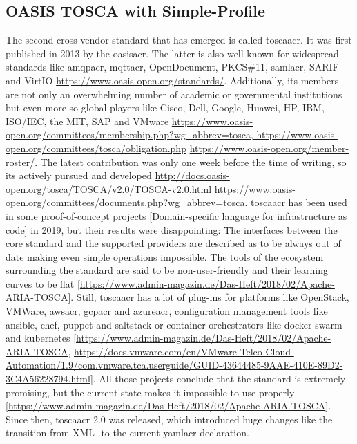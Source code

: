 \subsection{OASIS TOSCA with Simple-Profile}
The second cross-vendor standard that has emerged is called \gls{toscaacr}. It was first published in 2013 by the \gls{oasisacr}. The latter is also well-known for widespread standards like \gls{amqpacr}, \gls{mqttacr}, OpenDocument, PKCS\#11, \gls{samlacr}, SARIF and VirtIO \url{https://www.oasis-open.org/standards/}. Additionally, its members are not only an overwhelming number of academic or governmental institutions but even more so global players like Cisco, Dell, Google, Huawei, HP, IBM, ISO/IEC, the MIT, SAP and VMware \url{https://www.oasis-open.org/committees/membership.php?wg\_abbrev=tosca, https://www.oasis-open.org/committees/tosca/obligation.php} \url{https://www.oasis-open.org/member-roster/}. The latest contribution was only one week before the time of writing, so its actively pursued and developed \url{http://docs.oasis-open.org/tosca/TOSCA/v2.0/TOSCA-v2.0.html} \url{https://www.oasis-open.org/committees/documents.php?wg\_abbrev=tosca}.
\newline
\gls{toscaacr} has been used in some proof-of-concept projects [Domain-specific language for infrastructure as code] in 2019, but their results were disappointing: The interfaces between the core standard and the supported providers are described as to be always out of date making even simple operations impossible. The tools of the ecosystem surrounding the standard are said to be non-user-friendly and their learning curves to be flat [\url{https://www.admin-magazin.de/Das-Heft/2018/02/Apache-ARIA-TOSCA}].
Still, \gls{toscaacr} has a lot of plug-ins for platforms like OpenStack, VMWare, \gls{awsacr}, \gls{gcpacr} and \gls{azureacr}, configuration management tools like ansible, chef, puppet and saltstack or container orchestrators like docker swarm and kubernetes [\url{https://www.admin-magazin.de/Das-Heft/2018/02/Apache-ARIA-TOSCA}, \url{https://docs.vmware.com/en/VMware-Telco-Cloud-Automation/1.9/com.vmware.tca.userguide/GUID-43644485-9AAE-410E-89D2-3C4A56228794.html}].
All those projects conclude that the standard is extremely promising, but the current state makes it impossible to use properly [\url{https://www.admin-magazin.de/Das-Heft/2018/02/Apache-ARIA-TOSCA}].
\newline
Since then, \gls{toscaacr} 2.0 was released, which introduced huge changes like the transition from XML- to the current \gls{yamlacr}-declaration.
